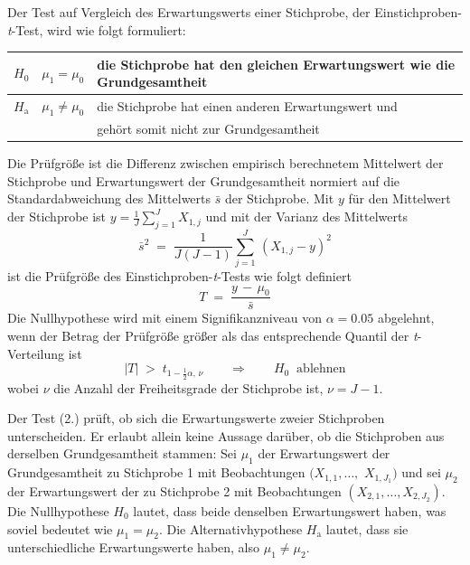 Der Test auf Vergleich des Erwartungswerts einer Stichprobe, der Einstichproben-\textsl{t}-Test,
wird wie folgt formuliert:
\begin{center}
\setlength{\extrarowheight}{.5em}
\begin{tabular}{c|cl}
$H_0$ & $\mu_1 = \mu_0$ & die Stichprobe hat den gleichen Erwartungswert wie die Grundgesamtheit\\
\hline
$H_\mathrm{a}$ & $\mu_1 \neq \mu_0$ & die Stichprobe hat einen anderen Erwartungswert und\\
 & & gehört somit nicht zur Grundgesamtheit
\end{tabular}
\end{center}

Die Prüfgröße ist die Differenz zwischen empirisch berechnetem Mittelwert der Stichprobe
und Erwartungswert der Grundgesamtheit normiert auf die
Standardabweichung des Mittelwerts $\bar s$ der Stichprobe. Mit $y$ für den Mittelwert der
Stichprobe ist $y = \frac{1}{J}\sum_{j=1}^J X_{1,j}$ und mit der Varianz des Mittelwerts
\begin{equation}
\bar s^2 \; = \; \frac{1}{J (J - 1)} \sum_{j=1}^{J} \, (X_{1,j} - y)^2
\end{equation}
ist die Prüfgröße des Einstichproben-\textsl{t}-Tests wie folgt definiert
\begin{equation}
T \; = \; \frac{y \, - \, \mu_0}{\bar s}
\label{tTestonesample}
\end{equation}
Die Nullhypothese wird mit einem Signifikanzniveau von $\alpha = 0.05$ abgelehnt, wenn
der Betrag der Prüfgröße größer als das entsprechende Quantil der \textsl{t}-Verteilung ist
\begin{equation}
|T| \; > \; t_{1-\frac{1}{2} \alpha, \, \nu} \qquad \Rightarrow \qquad H_0 \; \; \mathrm{ablehnen}
\end{equation}
wobei $\nu$ die Anzahl der Freiheitsgrade der Stichprobe ist, $\nu = J-1$.

Der Test (2.) prüft, ob sich die Erwartungswerte zweier Stichproben unterscheiden.
Er erlaubt allein keine Aussage darüber, ob die Stichproben aus derselben Grundgesamtheit stammen:
Sei $\mu_1$ der Erwartungswert der Grundgesamtheit zu Stichprobe 1 mit
Beobachtungen $(X_{1,1},\dots,$ $X_{1,J_1})$ und sei $\mu_2$ der Erwartungswert der
zu Stichprobe 2 mit Beobachtungen $(X_{2,1}, \dots, X_{2,J_2})$.
Die Nullhypothese $H_0$ lautet, dass beide denselben Erwartungswert haben,
was soviel bedeutet wie $\mu_1 = \mu_2$. Die Alternativhypothese $H_\mathrm{a}$
lautet, dass sie unterschiedliche Erwartungswerte haben, also $\mu_1 \neq \mu_2$.

